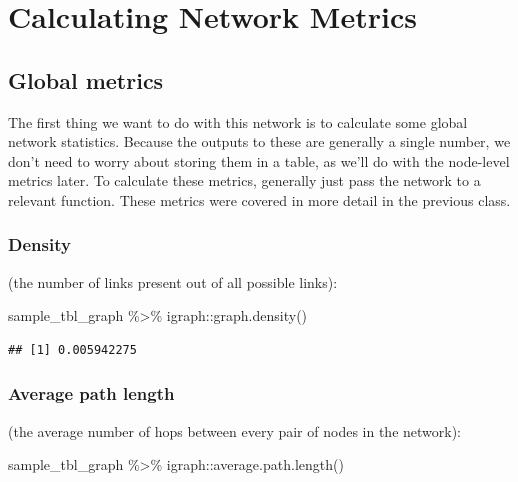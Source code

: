 \documentclass[
]{book}
\newenvironment{Shaded}{\begin{snugshade}}{\end{snugshade}}
\newcommand{\FunctionTok}[1]{\textcolor[rgb]{0.00,0.00,0.00}{#1}}
\newcommand{\NormalTok}[1]{#1}
\newcommand{\SpecialCharTok}[1]{\textcolor[rgb]{0.00,0.00,0.00}{#1}}
\begin{document}
\hypertarget{calculating-network-metrics}{%
\section{Calculating Network Metrics}\label{calculating-network-metrics}}

\hypertarget{global-metrics-1}{%
\subsection{Global metrics}\label{global-metrics-1}}

The first thing we want to do with this network is to calculate some global network statistics. Because the outputs to these are generally a single number, we don't need to worry about storing them in a table, as we'll do with the node-level metrics later. To calculate these metrics, generally just pass the network to a relevant function. These metrics were covered in more detail in the previous class.

\hypertarget{density-1}{%
\subsubsection{Density}\label{density-1}}

(the number of links present out of all possible links):

\begin{Shaded}
\begin{Highlighting}[]
\NormalTok{sample\_tbl\_graph }\SpecialCharTok{\%\textgreater{}\%}\NormalTok{ igraph}\SpecialCharTok{::}\FunctionTok{graph.density}\NormalTok{()}
\end{Highlighting}
\end{Shaded}

\begin{verbatim}
## [1] 0.005942275
\end{verbatim}

\hypertarget{average-path-length-1}{%
\subsubsection{Average path length}\label{average-path-length-1}}

(the average number of hops between every pair of nodes in the network):

\begin{Shaded}
\begin{Highlighting}[]
\NormalTok{sample\_tbl\_graph }\SpecialCharTok{\%\textgreater{}\%}\NormalTok{ igraph}\SpecialCharTok{::}\FunctionTok{average.path.length}\NormalTok{()}
\end{Highlighting}
\end{Shaded}
\end{document}
